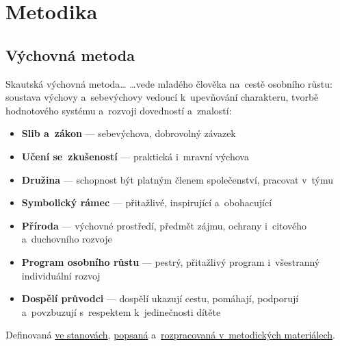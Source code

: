 \documentclass[compress, ucs, xelatex, 11pt, xcolor=dvipsnames, print, aspectratio=169,
	hyperref={
		bookmarks=true,
		unicode=true,
		colorlinks=true,
		pdftitle={Skautska vychovna metoda},
		plainpages=false,
		pdfauthor={Vojtech Zeisek},
		pdfsubject={Skautska vychovna metoda a jeji vyvoj za posledni stoleti a desetileti},
		pdfcreator={XeLaTeX},
		pdfkeywords={Junak, Pedagogika, Skaut, Skauting, Vychovna metoda},
		linkcolor=Red, %
		anchorcolor=ForestGreen, %
		citecolor=ForestGreen, %
		filecolor=ForestGreen, %
		menucolor=ForestGreen, %
		urlcolor=Sepia, %
		pdftex},
	url={hyphens, lowtilde} %
	]{beamer}
\begin{document}
\section{Metodika}

\subsection{Výchovná metoda}

\begin{frame}{Skautská výchovná metoda\ldots}
	\ldots vede mladého člověka na~cestě osobního růstu: soustava výchovy a~sebevýchovy vedoucí k~upevňování charakteru, tvorbě hodnotového systému a~rozvoji dovedností a~znalostí:
	\begin{itemize}
		\item \textbf{Slib a~zákon} --- sebevýchova, dobrovolný závazek
		\item \textbf{Učení se~zkušeností} --- praktická i~mravní výchova
		\item \textbf{Družina} --- schopnost být platným členem společenství, pracovat v~týmu
		\item \textbf{Symbolický rámec} --- přitažlivé, inspirující a~obohacující
		\item \textbf{Příroda} --- výchovné prostředí, předmět zájmu, ochrany i~citového a~duchovního rozvoje
		\item \textbf{Program osobního růstu} --- pestrý, přitažlivý program i~všestranný individuální rozvoj
		\item \textbf{Dospělí průvodci} --- dospělí ukazují cestu, pomáhají, podporují a~povzbuzují s~respektem k~jedinečnosti dítěte
	\end{itemize}
	Definovaná \href{https://krizovatka.skaut.cz/stredisko/administrativa/novy-obcansky-zakonik-stanovy/nove-stanovy}{ve stanovách}, \href{https://krizovatka.skaut.cz/oddil/program/3360-skautska-vychovna-metoda}{popsaná} a~\href{https://krizovatka.skaut.cz/oddil/program/}{rozpracovaná v~metodických materiálech}.
\end{frame}
\end{document}
